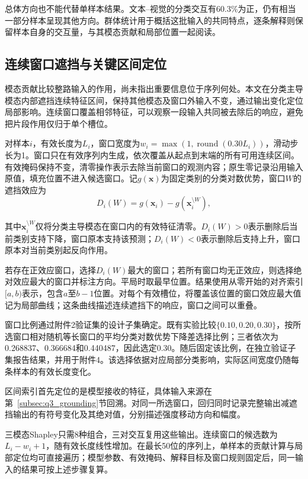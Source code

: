 \documentclass[UTF8,a4paper,12pt]{ctexart}
\newcommand{\QThreeParagraph}{\par\noindent\hspace*{2em}}
\begin{document}
\QThreeParagraph 总体方向也不能代替单样本结果。文本--视觉的分类交互有60.3\%为正，仍有相当一部分样本呈现其他方向。群体统计用于概括这批输入的共同特点，逐条解释则保留样本自身的交互量，与其模态贡献和局部位置一起阅读。

\subsection{连续窗口遮挡与关键区间定位}\label{subsec:q3_temporal}
\QThreeParagraph 模态贡献比较整路输入的作用，尚未指出重要信息位于序列何处。本文在分类主导模态内部遮挡连续特征区间，保持其他模态及窗口外输入不变，通过输出变化定位局部影响。连续窗口覆盖相邻特征，可以观察一段输入共同被去除后的响应，避免把片段作用仅归于单个槽位。

\QThreeParagraph 对样本$i$，有效长度为$L_i$，窗口宽度为$w_i=\max(1,\operatorname{round}(0.30L_i))$，滑动步长为1。窗口只在有效序列内生成，依次覆盖从起点到末端的所有可用连续区间。有效掩码保持不变，清零操作表示去除当前窗口的观测内容；原生零记录沿用输入原值，填充位置不进入候选窗口。记$g(\mathbf x)$为固定类别的分类对数优势，窗口$W$的遮挡效应为
\begin{equation}
D_i(W)=g(\mathbf x_i)-g\!\left(\mathbf x_i^{\setminus W}\right),
\label{eq:q3_occlusion}
\end{equation}
\QThreeParagraph 其中$\mathbf x_i^{\setminus W}$仅将分类主导模态在窗口内的有效特征清零。$D_i(W)>0$表示删除后当前类别支持下降，窗口原本支持该预测；$D_i(W)<0$表示删除后支持上升，窗口原本对当前类别起反向作用。

\QThreeParagraph 若存在正效应窗口，选择$D_i(W)$最大的窗口；若所有窗口均无正效应，则选择绝对效应最大的窗口并标注方向。平局时取最早位置。结果使用从零开始的对齐索引$[a,b)$表示，包含$a$至$b-1$位置。对每个有效槽位，将覆盖该位置的窗口效应最大值记为局部曲线；这条曲线描述连续遮挡下的响应，窗口之间可以重叠。

\QThreeParagraph 窗口比例通过附件2验证集的设计子集确定。既有实验比较$\{0.10,0.20,0.30\}$，按所选窗口相对随机等长窗口的平均分类对数优势下降差选择比例；三者依次为0.268837、0.366684和0.440487，因此选定0.30。随后固定该比例，在独立验证子集报告结果，并用于附件4。该选择依据对应局部分类影响，实际区间宽度仍随每条样本的有效长度变化。

\QThreeParagraph 区间索引首先定位的是模型接收的特征，具体输入来源在第~\ref{subsec:q3_grounding}节回溯。对同一所选窗口，回归同时记录完整输出减遮挡输出的有符号变化及其绝对值，分别描述强度移动方向和幅度。

\QThreeParagraph 三模态Shapley只需8种组合，三对交互复用这些输出。连续窗口的候选数为$L_i-w_i+1$，随有效长度线性增加。在最长50位的序列上，单样本的贡献计算与局部定位均可直接遍历；模型参数、有效掩码、解释目标及窗口规则固定后，同一输入的结果可按上述步骤复算。
\end{document}
